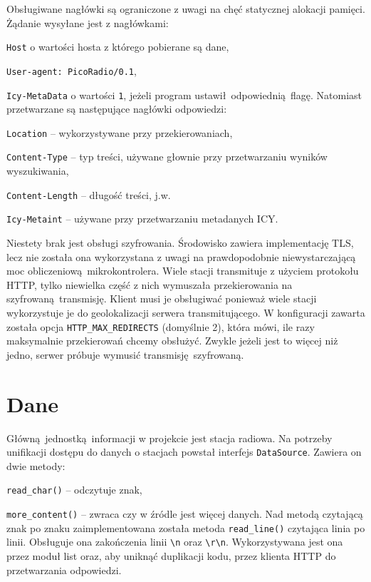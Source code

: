 \documentclass[12pt]{report}
\let\tempone\itemize
\let\temptwo\enditemize
\renewenvironment{itemize}{\tempone\setlength{\itemsep}{0cm}}{\temptwo}
\begin{document}
		Obsługiwane nagłówki są ograniczone z uwagi na chęć statycznej alokacji pamięci. Żądanie wysyłane jest z nagłówkami:
		\begin{itemize}
			\item \lstinline|Host| o wartości hosta z którego pobierane są dane,
			\item \lstinline|User-agent: PicoRadio/0.1|,
			\item \lstinline|Icy-MetaData| o wartości \lstinline|1|, jeżeli program ustawił odpowiednią flagę.
		\end{itemize}
		Natomiast przetwarzane są następujące nagłówki odpowiedzi:
		\begin{itemize}
			\item \lstinline|Location| -- wykorzystywane przy przekierowaniach,
			\item \lstinline|Content-Type| -- typ treści, używane głownie przy przetwarzaniu wyników wyszukiwania,
			\item \lstinline|Content-Length| -- długość treści, j.w.
			\item \lstinline|Icy-Metaint| -- używane przy przetwarzaniu metadanych ICY.
		\end{itemize}
		
		Niestety brak jest obsługi szyfrowania. Środowisko zawiera implementację TLS, lecz nie została ona wykorzystana z uwagi na prawdopodobnie niewystarczającą moc obliczeniową mikrokontrolera. Wiele stacji transmituje z użyciem protokołu HTTP, tylko niewielka część z nich wymuszała przekierowania na szyfrowaną transmisję. Klient musi je obsługiwać ponieważ wiele stacji wykorzystuje je do geolokalizacji serwera transmitującego. W konfiguracji zawarta została opcja \lstinline|HTTP_MAX_REDIRECTS| (domyślnie 2), która mówi, ile razy maksymalnie przekierowań chcemy obsłużyć. Zwykle jeżeli jest to więcej niż jedno, serwer próbuje wymusić transmisję szyfrowaną.
		
	\section{Dane}
		Główną jednostką informacji w projekcie jest stacja radiowa. Na potrzeby unifikacji dostępu do danych o stacjach powstał interfejs \lstinline|DataSource|. Zawiera on dwie metody:
		\begin{itemize}
			\item \lstinline|read_char()| -- odczytuje znak,
			\item \lstinline|more_content()| -- zwraca czy w źródle jest więcej danych.
		\end{itemize}
		Nad metodą czytającą znak po znaku zaimplementowana została metoda \lstinline|read_line()| czytająca linia po linii. Obsługuje ona zakończenia linii \lstinline|\n| oraz \lstinline|\r\n|. Wykorzystywana jest ona przez moduł list oraz, aby uniknąć duplikacji kodu, przez klienta HTTP do przetwarzania odpowiedzi.
		
\end{document}
